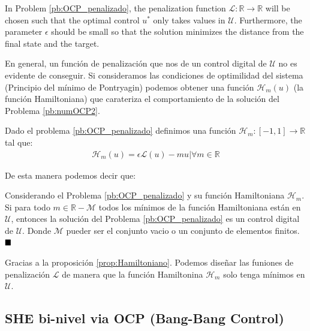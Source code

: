 In Problem \ref{pb:OCP_penalizado}, the penalization function $\mathcal L: \mathbb{R} \rightarrow \mathbb{R}$ will be chosen such that the optimal control $u^*$ only takes values in $\mathcal U$. Furthermore, the parameter $\epsilon$ should be small so that the solution minimizes the distance from the final state and the target.

En general, un función de penalización que nos de un control digital de $\mathcal{U}$ no es evidente de conseguir. Si consideramos las condiciones de optimilidad  del sistema (Principio del mínimo de Pontryagin) podemos obtener una función $\mathcal{H}_m(u)$ (la función Hamiltoniana) que carateriza el comportamiento de la solución del Problema \ref{pb:numOCP2}.
\vspace{1em}
\begin{definition}[Hamiltoniano]
    Dado el problema \ref{pb:OCP_penalizado} definimos una función $\mathcal{H}_m:[-1,1]\rightarrow \mathbb{R}$ tal que:
    \begin{gather}\label{Hm}
        \mathcal{H}_m(u) = \epsilon \mathcal{L}(u) - mu  |  \forall m \in \mathbb{R}
    \end{gather}
\end{definition}

De esta manera podemos decir que:
\vspace{1em}
\begin{proposition}\label{prop:Hamiltoniano}
    Considerando el Problema \ref{pb:OCP_penalizado} y su función Hamiltoniana $\mathcal{H}_m$. Si para todo $m \in \mathbb{R} - \mathcal{M}$ todos los mínimos de la función Hamiltoniana están en $\mathcal{U}$, entonces la solución del Problema \ref{pb:OCP_penalizado} es un control digital de $\mathcal{U}$. Donde $\mathcal{M}$ pueder ser el conjunto vacio o un conjunto de elementos finitos. $\hfill \blacksquare $
\end{proposition}

Gracias a la proposición \ref{prop:Hamiltoniano}. Podemos diseñar las funiones de penalización $\mathcal{L}$ de manera que la función Hamiltonina $\mathcal{H}_m$ solo tenga mínimos en $\mathcal{U}$. 


\subsection{SHE bi-nivel via OCP (Bang-Bang Control)} 

